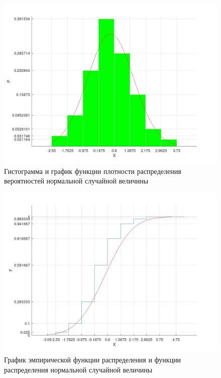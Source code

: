 \begin{figure}[H]
	\begin{center}
		\includegraphics[scale=0.4]{assets/hist.jpg}
		\caption{Гистограмма и график функции плотности распределения вероятностей нормальной случайной величины}
	\end{center}
\end{figure}

\begin{figure}[H]
	\begin{center}
		\includegraphics[scale=0.4]{assets/cdf.jpg}
		\caption{График эмпирической функции распределения и функции распределения нормальной случайной величины}
	\end{center}
\end{figure}